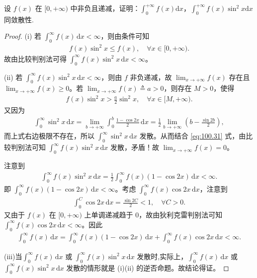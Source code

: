 \documentclass[../../main.tex]{subfiles}%
\begin{document}
\begin{example}
设 \(f(x)\) 在 \([0,+\infty)\) 中非负且递减，证明：\(\int_{0}^{+\infty} f(x) \mathrm{d}x\)，\(\int_{0}^{+\infty} f(x)\sin^{2}x \mathrm{d}x\) 同敛散性. 
\end{example}
\begin{proof}
(i) 若 \(\int_0^\infty f(x) \, \mathrm{d}x < \infty\)，则由条件可知
\begin{align*}
f(x) \sin^2 x \leqslant f(x), \quad \forall x \in [0, +\infty).
\end{align*}
故由比较判别法可得 \(\int_0^\infty f(x) \sin^2 x \, \mathrm{d}x < \infty\)。

(ii) 若 \(\int_0^\infty f(x) \sin^2 x \, \mathrm{d}x < \infty\)，则由 \(f\) 非负递减，故 \(\lim_{x \to +\infty} f(x)\) 存在且 \(\lim_{x \to +\infty} f(x) \geqslant 0\)。若 \(\lim_{x \to +\infty} f(x) \triangleq a > 0\)，则存在 \(M > 0\)，使得
\begin{align}
f(x) \sin^2 x > \frac{a}{2} \sin^2 x, \quad \forall x \in [M, +\infty). \label{eq:100.31}
\end{align}
又因为
\begin{align*}
\int_0^\infty \sin^2 x \, \mathrm{d}x = \lim_{b \to +\infty} \int_0^b \frac{1 - \cos 2x}{2} \, \mathrm{d}x = \frac{1}{2} \lim_{b \to +\infty} \left( b - \frac{\sin 2b}{2} \right),
\end{align*}
而上式右边极限不存在，所以 \(\int_0^\infty \sin^2 x \, \mathrm{d}x\) 发散。从而结合 \eqref{eq:100.31} 式，由比较判别法可知 \(\int_0^\infty f(x) \sin^2 x \, \mathrm{d}x\) 发散，矛盾！故 \(\lim_{x \to +\infty} f(x) = 0\)。

注意到
\begin{align*}
\int_0^\infty f(x) \sin^2 x \, \mathrm{d}x = \frac{1}{2} \int_0^\infty f(x) (1 - \cos 2x) \, \mathrm{d}x < \infty.
\end{align*}
即 \(\int_0^\infty f(x) (1 - \cos 2x) \, \mathrm{d}x < \infty\)。考虑 \(\int_0^\infty f(x) \cos 2x \, \mathrm{d}x\)，注意到
\begin{align*}
\int_0^C \cos 2x \, \mathrm{d}x = \frac{\sin 2C}{2} < 1, \quad \forall C > 0.
\end{align*}
又由于 \(f(x)\) 在 \([0, +\infty)\) 上单调递减趋于 0，故由狄利克雷判别法可知 \(\int_0^\infty f(x) \cos 2x \, \mathrm{d}x < \infty\)。因此
\begin{align*}
\int_0^\infty f(x) \, \mathrm{d}x = \int_0^\infty f(x) (1 - \cos 2x) \, \mathrm{d}x + \int_0^\infty f(x) \cos 2x \, \mathrm{d}x < \infty.
\end{align*}

(iii)当\(\int_0^\infty f(x) \, \mathrm{d}x\) 或 \(\int_0^\infty f(x) \sin^2 x \, \mathrm{d}x\) 发散时,实际上，\(\int_0^\infty f(x) \, \mathrm{d}x\) 或 \(\int_0^\infty f(x) \sin^2 x \, \mathrm{d}x\) 发散的情形就是 (i)(ii) 的逆否命题。故结论得证。
\end{proof}
\end{document}
